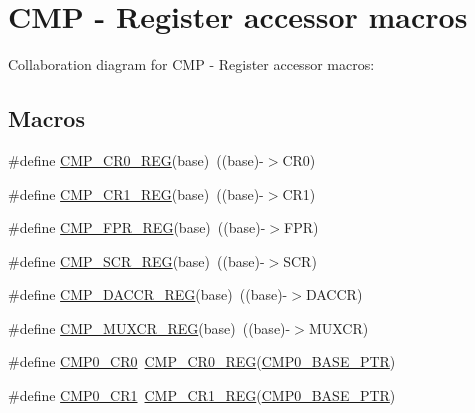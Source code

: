 \hypertarget{group___c_m_p___register___accessor___macros}{}\section{C\+MP -\/ Register accessor macros}
\label{group___c_m_p___register___accessor___macros}
Collaboration diagram for C\+MP -\/ Register accessor macros\+:
\subsection*{Macros}
\begin{DoxyCompactItemize}
\item 
\#define \hyperlink{group___c_m_p___register___accessor___macros_ga027ebf4e2c4654b6e863e070cb299128}{C\+M\+P\+\_\+\+C\+R0\+\_\+\+R\+EG}(base)~((base)-\/$>$C\+R0)
\item 
\#define \hyperlink{group___c_m_p___register___accessor___macros_gaccbe9acfec0cbe3a83f7331f899f3240}{C\+M\+P\+\_\+\+C\+R1\+\_\+\+R\+EG}(base)~((base)-\/$>$C\+R1)
\item 
\#define \hyperlink{group___c_m_p___register___accessor___macros_gac3a57bc4a8faf059f7271bca5af68846}{C\+M\+P\+\_\+\+F\+P\+R\+\_\+\+R\+EG}(base)~((base)-\/$>$F\+PR)
\item 
\#define \hyperlink{group___c_m_p___register___accessor___macros_ga678da61cf26cf0494da5f50012b39a88}{C\+M\+P\+\_\+\+S\+C\+R\+\_\+\+R\+EG}(base)~((base)-\/$>$S\+CR)
\item 
\#define \hyperlink{group___c_m_p___register___accessor___macros_ga5b7c17c68ee9198e701deff8f750ca2b}{C\+M\+P\+\_\+\+D\+A\+C\+C\+R\+\_\+\+R\+EG}(base)~((base)-\/$>$D\+A\+C\+CR)
\item 
\#define \hyperlink{group___c_m_p___register___accessor___macros_gaf82bcece4b697f01171a785589591a8c}{C\+M\+P\+\_\+\+M\+U\+X\+C\+R\+\_\+\+R\+EG}(base)~((base)-\/$>$M\+U\+X\+CR)
\item 
\#define \hyperlink{group___c_m_p___register___accessor___macros_ga0b4ea995265b027fb308b236b2f0afd4}{C\+M\+P0\+\_\+\+C\+R0}~\hyperlink{group___c_m_p___register___accessor___macros_ga027ebf4e2c4654b6e863e070cb299128}{C\+M\+P\+\_\+\+C\+R0\+\_\+\+R\+EG}(\hyperlink{group___c_m_p___peripheral_ga5a7a6b1d0743a05435ba5cb2dc2b3431}{C\+M\+P0\+\_\+\+B\+A\+S\+E\+\_\+\+P\+TR})
\item 
\#define \hyperlink{group___c_m_p___register___accessor___macros_ga993cebfc8cb6bcf6caec49cd75218d17}{C\+M\+P0\+\_\+\+C\+R1}~\hyperlink{group___c_m_p___register___accessor___macros_gaccbe9acfec0cbe3a83f7331f899f3240}{C\+M\+P\+\_\+\+C\+R1\+\_\+\+R\+EG}(\hyperlink{group___c_m_p___peripheral_ga5a7a6b1d0743a05435ba5cb2dc2b3431}{C\+M\+P0\+\_\+\+B\+A\+S\+E\+\_\+\+P\+TR})

\end{DoxyCompactItemize}
